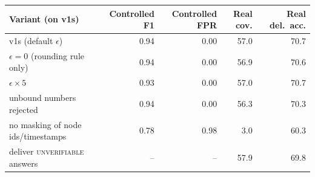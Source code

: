 \begin{tabular}{lrrrr}
\toprule
Variant (on v1s) & Controlled F1 & Controlled FPR & Real cov. & Real del.\ acc. \\
\midrule
v1s (default $\epsilon$) & 0.94 & 0.00 & 57.0 & 70.7 \\
$\epsilon=0$ (rounding rule only) & 0.94 & 0.00 & 56.9 & 70.6 \\
$\epsilon\times5$ & 0.93 & 0.00 & 57.0 & 70.7 \\
unbound numbers rejected & 0.94 & 0.00 & 56.3 & 70.3 \\
no masking of node ids/timestamps & 0.78 & 0.98 & 3.0 & 60.3 \\
deliver \textsc{unverifiable} answers & -- & -- & 57.9 & 69.8 \\
\bottomrule
\end{tabular}